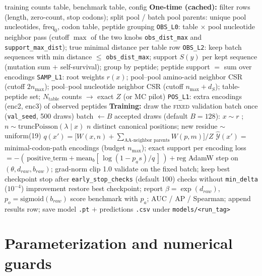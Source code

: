 \documentclass[11pt]{article}
\begin{document}
\begin{algorithm}[htbp]
\caption{PULSE SGD (pool + batch, multi-mutation proposal)}
\label{alg:sgd}
\begin{algorithmic}[1]
\Require training counts table, benchmark table, config
\Statex \textbf{One-time (cached):}
\State filter rows (length, zero-count, stop codons); split pool / batch
\State pool parents: unique pool nucleotides, $\text{freq}_0$, codon
table, peptide grouping
\State \texttt{OBS\_L0}: table $\times$ pool nucleotide neighbor pass
(cutoff $\max$ of the two knobs \texttt{obs\_dist\_max} and
\texttt{support\_max\_dist}); true minimal distance per table row
\State \texttt{OBS\_L2}: keep batch sequences with min distance $\le$
\texttt{obs\_dist\_max}; support $S(y)$ per kept sequence (mutation sum
$+$ self-survival); group by peptide; peptide support $=$ sum over
encodings
\State \texttt{SAMP\_L1}: root weights $r(x)$; pool--pool amino-acid
neighbor CSR (cutoff $2n_{\max}$); pool--pool nucleotide neighbor CSR
(cutoff $n_{\max} + d_S$); table-peptide set; $N_{\text{table}}$ counts
$\to$ exact $Z$ (or MC pilot)
\State \texttt{POS\_L1}: extra encodings (enc2, enc3) of observed
peptides
\Statex \textbf{Training:}
\State draw the \textsc{fixed} validation batch once
(\texttt{val\_seed}, 500 draws)
\State batch $\gets B$ accepted draws (default $B = 128$):
\Repeat
\State $x \sim r$ ; \; $n \sim \text{truncPoisson}(\lambda \mid x)$
\State $n$ distinct canonical positions; new residue $\sim$
uniform(19)
\State $q(x') = \big[ W(x, n) + \sum_{\text{AA-neighbor parents}}
W(p, m) \big] / Z$
\State $\hat{\mathcal{Y}}(x') =$ minimal-codon-path encodings (budget
$n_{\max}$); exact support per encoding
\State loss $= -(\, \text{positive\_term} + \text{mean}_b[\,
\log(1 - p_a s) / q \,]\,) + \text{reg}$
\State AdamW step on $(\theta, d_{raw}, b_{raw})$; grad-norm clip 1.0
\State validate on the fixed batch; keep best checkpoint
\State stop after \texttt{early\_stop\_checks} (default 100) checks
without \texttt{min\_delta} ($10^{-4}$) improvement
\EndIf
\EndFor
\State restore best checkpoint; report $\beta = \exp(d_{raw})$,
$p_o = \text{sigmoid}(b_{raw})$
\State score benchmark with $p_a$; AUC / AP / Spearman; append results
row; save model \texttt{.pt} $+$ predictions \texttt{.csv} under
\texttt{models/<run\_tag>}
\end{algorithmic}
\end{algorithm}

\section{Parameterization and numerical guards}\label{sec:guards}
\end{document}
